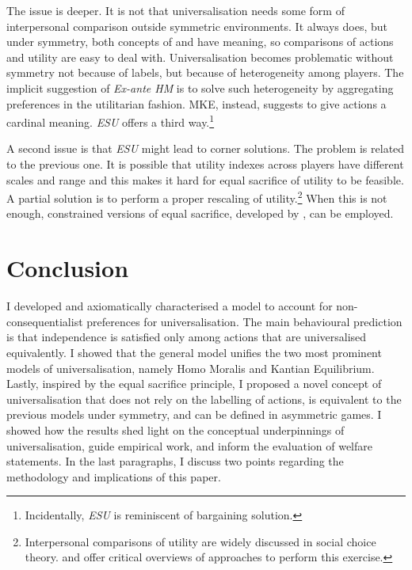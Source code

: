 The issue is deeper. It is not that universalisation needs some form of interpersonal comparison outside symmetric environments. It always does, but under symmetry, both concepts of  and  have meaning, so comparisons of actions and utility are easy to deal with. Universalisation becomes problematic without symmetry not because of labels, but because of heterogeneity among players. The implicit suggestion of \textit{Ex-ante HM} is to solve such heterogeneity by aggregating preferences in the utilitarian fashion. MKE, instead, suggests to give actions a cardinal meaning. \textit{ESU} offers a third way.\footnote{Incidentally, \textit{ESU} is reminiscent of \cite{kalaiOtherSolutionsNashs1975} bargaining solution.}

A second issue is that \textit{ESU} might lead to corner solutions. The problem is related to the previous one. It is possible that utility indexes across players have different scales and range and this makes it hard for equal sacrifice of utility to be feasible. A partial solution is to perform a proper rescaling of utility.\footnote{Interpersonal comparisons of utility are widely discussed in social choice theory. \citet[Ch. 4]{binmoreGameTheorySocial1994a} and \citet[Ch. 7]{sen2017collective} offer critical overviews of approaches to perform this exercise.} When this is not enough, constrained versions of equal sacrifice, developed by \cite{stovallEqualSacrificeTaxation2020}, can be employed.

\section{Conclusion}\label{sec:conclusionuniv}

I developed and axiomatically characterised a model to account for non-consequentialist preferences for universalisation. The main behavioural prediction is that independence is satisfied only among actions that are universalised equivalently. I showed that the general model unifies the two most prominent models of universalisation, namely Homo Moralis and Kantian Equilibrium. Lastly, inspired by the equal sacrifice principle, I proposed a novel concept of universalisation that does not rely on the labelling of actions, is equivalent to the previous models under symmetry, and can be defined in asymmetric games. I showed how the results shed light on the conceptual underpinnings of universalisation, guide empirical work, and inform the evaluation of welfare statements. In the last paragraphs, I discuss two points regarding the methodology and implications of this paper.

